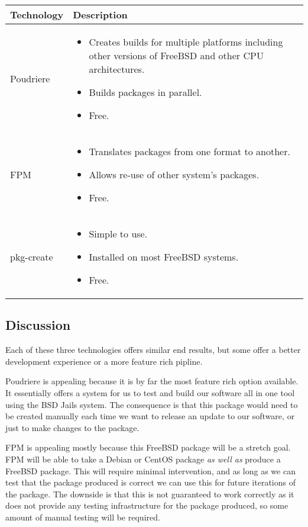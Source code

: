 \begin{center}
  \begin{tabular}{ | l | p{10cm} |}
    \hline
    Technology & Description  \\ \hline
    Poudriere \cite{poudriere-tutorial} &
    \begin{itemize}
      \item Creates builds for multiple platforms including other versions of FreeBSD and other CPU architectures.
      \item Builds packages in parallel.
      \item Free.
    \end{itemize}\\ \hline
    FPM \cite{fpm-home} &
    \begin{itemize}
      \item Translates packages from one format to another.
      \item Allows re-use of other system's packages.
      \item Free.
    \end{itemize}\\ \hline
    pkg-create \cite{pkg-create-man} &
    \begin{itemize}
      \item Simple to use.
      \item Installed on most FreeBSD systems.
      \item Free.
    \end{itemize}\\ \hline
  \end{tabular}
\end{center}

\subsection{Discussion}

Each of these three technologies offers similar end results, but some offer a better development experience or a more feature rich pipline.

Poudriere is appealing because it is by far the most feature rich option available.
It essentially offers a system for us to test and build our software all in one tool using the BSD Jails system.
The consequence is that this package would need to be created manually each time we want to release an update to our software, or just to make changes to the package.

FPM is appealing mostly because this FreeBSD package will be a stretch goal.
FPM will be able to take a Debian or CentOS package \textit{as well as} produce a FreeBSD package.
This will require minimal intervention, and as long as we can test that the package produced is correct we can use this for future iterations of the package.
The downside is that this is not guaranteed to work correctly as it does not provide any testing infrastructure for the package produced, so some amount of manual testing will be required.

